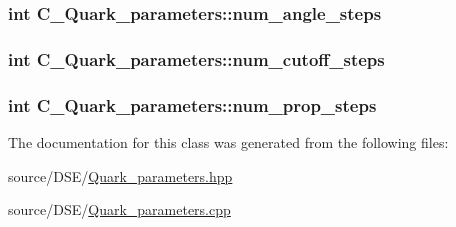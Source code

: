 \hypertarget{class_c___quark__parameters_ace76ec22c1f3697f2d17777fa9067657}{
\subsubsection[{num\-\_\-angle\-\_\-steps}]{\setlength{\rightskip}{0pt plus 5cm}int C\-\_\-\-Quark\-\_\-parameters\-::num\-\_\-angle\-\_\-steps}}\label{class_c___quark__parameters_ace76ec22c1f3697f2d17777fa9067657}
\hypertarget{class_c___quark__parameters_a28d72426b45b7565713e83ecb42a2d1b}{
\subsubsection[{num\-\_\-cutoff\-\_\-steps}]{\setlength{\rightskip}{0pt plus 5cm}int C\-\_\-\-Quark\-\_\-parameters\-::num\-\_\-cutoff\-\_\-steps}}\label{class_c___quark__parameters_a28d72426b45b7565713e83ecb42a2d1b}
\hypertarget{class_c___quark__parameters_a60916d990db056834babfd4e515b30da}{
\subsubsection[{num\-\_\-prop\-\_\-steps}]{\setlength{\rightskip}{0pt plus 5cm}int C\-\_\-\-Quark\-\_\-parameters\-::num\-\_\-prop\-\_\-steps}}\label{class_c___quark__parameters_a60916d990db056834babfd4e515b30da}


The documentation for this class was generated from the following files\-:\begin{DoxyCompactItemize}
\item 
source/\-D\-S\-E/\hyperlink{_quark__parameters_8hpp}{Quark\-\_\-parameters.\-hpp}\item 
source/\-D\-S\-E/\hyperlink{_quark__parameters_8cpp}{Quark\-\_\-parameters.\-cpp}\end{DoxyCompactItemize}
